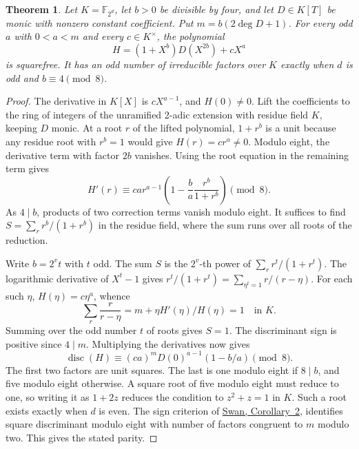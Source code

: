 \documentclass[11pt]{article}
\newtheorem{theorem}{Theorem}
\begin{document}
\begin{theorem}\label{thm:progression-factor-parity}
Let \(K=\mathbb F_{2^d}\), let \(b>0\) be divisible by four, and let
\(D\in K[T]\) be monic with nonzero constant coefficient. Put
\(m=b(2\deg D+1)\). For every odd \(a\) with \(0<a<m\) and every
\(c\in K^\times\), the polynomial
\[
              H=(1+X^b)D(X^{2b})+cX^a
\]
is squarefree. It has an odd number of irreducible factors over \(K\)
exactly when \(d\) is odd and \(b\equiv4\pmod8\).
\end{theorem}
\begin{proof}
The derivative in \(K[X]\) is \(cX^{a-1}\), and \(H(0)\ne0\).
Lift the coefficients to the ring of integers of the unramified
2-adic extension with residue field \(K\), keeping \(D\) monic.
At a root \(r\) of the lifted polynomial, \(1+r^b\) is a unit because
any residue root with \(r^b=1\) would give \(H(r)=cr^a\ne0\).
Modulo eight, the derivative term with factor \(2b\) vanishes.
Using the root equation in the remaining term gives
\[
 H'(r)\equiv ca r^{a-1}
   \left(1-\frac ba\frac{r^b}{1+r^b}\right)\pmod8 .
\]
As \(4\mid b\), products of two correction terms vanish modulo eight.
It suffices to find \(S=\sum_r r^b/(1+r^b)\) in the residue field,
where the sum runs over all roots of the reduction.

Write \(b=2^v t\) with \(t\) odd. The sum \(S\) is the \(2^v\)-th
power of \(\sum_r r^t/(1+r^t)\). The logarithmic derivative of
\(X^t-1\) gives \(r^t/(1+r^t)=\sum_{\eta^t=1}r/(r-\eta)\).
For each such \(\eta\), \(H(\eta)=c\eta^a\), whence
\[
 \sum_r\frac r{r-\eta}=m+\eta H'(\eta)/H(\eta)=1\quad\text{in }K.
\]
Summing over the odd number \(t\) of roots gives \(S=1\).
The discriminant sign is positive since \(4\mid m\). Multiplying
the derivatives now gives
\[
 \operatorname{disc}(H)\equiv (ca)^m D(0)^{a-1}(1-b/a)\pmod8 .
\]
The first two factors are unit squares. The last is one modulo eight
if \(8\mid b\), and five modulo eight otherwise. A square root of
five modulo eight must reduce to one, so writing it as \(1+2z\)
reduces the condition to \(z^2+z=1\) in \(K\). Such a root exists
exactly when \(d\) is even. The sign criterion of
\href{https://msp.org/pjm/1962/12-3/pjm-v12-n3-p27-p.pdf}{Swan, Corollary~2},
identifies square discriminant modulo eight with number of factors
congruent to \(m\) modulo two. This gives the stated parity.
\end{proof}
\end{document}
